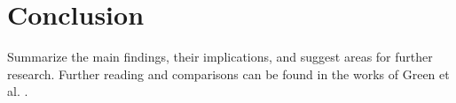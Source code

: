 \documentclass{article}
\begin{document}
\section{Conclusion}
Summarize the main findings, their implications, and suggest areas for further research. Further reading and comparisons can be found in the works of Green et al. \cite{Green2016}.

\end{document}
